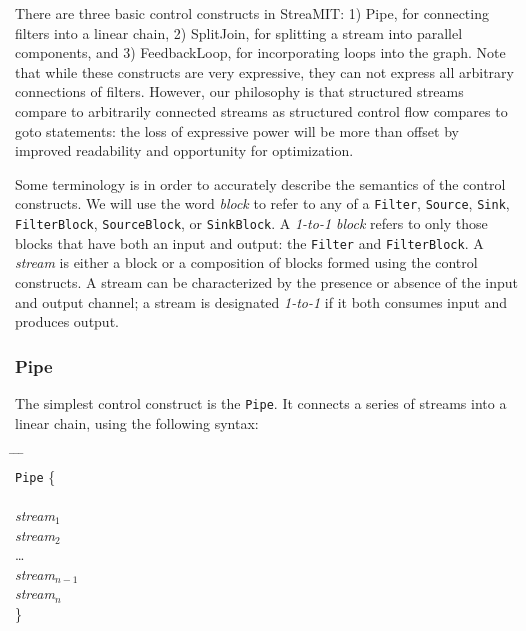 \documentclass[draft]{article}
\begin{document}
There are three basic control constructs in StreaMIT: 1) Pipe, for
connecting filters into a linear chain, 2) SplitJoin, for splitting a
stream into parallel components, and 3) FeedbackLoop, for
incorporating loops into the graph.  Note that while these constructs
are very expressive, they can not express all arbitrary connections of
filters.  However, our philosophy is that structured streams compare
to arbitrarily connected streams as structured control flow compares
to goto statements: the loss of expressive power will be more than
offset by improved readability and opportunity for optimization.

Some terminology is in order to accurately describe the semantics of
the control constructs.  We will use the word {\it block} to refer to
any of a {\tt Filter}, {\tt Source}, {\tt Sink}, {\tt FilterBlock},
{\tt SourceBlock}, or {\tt SinkBlock}.  A {\it 1-to-1 block} refers to
only those blocks that have both an input and output: the {\tt Filter}
and {\tt FilterBlock}.  A {\it stream} is either a block or a
composition of blocks formed using the control constructs.  A stream
can be characterized by the presence or absence of the input and
output channel; a stream is designated {\it 1-to-1} if it both
consumes input and produces output.

\subsubsection{Pipe}

The simplest control construct is the {\tt Pipe}.  It connects a
series of streams into a linear chain, using the following syntax:

\begin{tabbing}
\hspace{0.2in} \= \hspace{0.2in} \= \hspace{0.2in} \= \hspace{0.2in} \= \\

{\tt Pipe} \{ \\ \\
\> {\it stream$_1$} \\
\> {\it stream$_2$} \\
\> \dots \\
\> {\it stream$_{n-1}$} \\
\> {\it stream$_n$} \\

\}
\end{tabbing}
\end{document}
